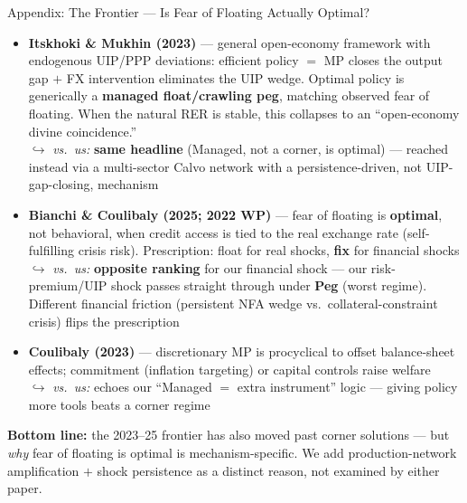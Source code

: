 \begin{frame}{Appendix: The Frontier --- Is Fear of Floating Actually Optimal?}

{\scriptsize
\begin{itemize}\setlength{\itemsep}{5pt}
\item \textbf{Itskhoki \& Mukhin (2023)} --- general open-economy framework with endogenous UIP/PPP deviations: efficient policy $=$ MP closes the output gap $+$ FX intervention eliminates the UIP wedge. Optimal policy is generically a \textbf{managed float/crawling peg}, matching observed fear of floating. When the natural RER is stable, this collapses to an ``open-economy divine coincidence.''
\\ \textcolor{customgreen!55!black}{$\hookrightarrow$ \emph{vs.\ us:}} \textbf{same headline} (Managed, not a corner, is optimal) --- reached instead via a multi-sector Calvo network with a persistence-driven, not UIP-gap-closing, mechanism

\item \textbf{Bianchi \& Coulibaly (2025; 2022 WP)} --- fear of floating is \textbf{optimal}, not behavioral, when credit access is tied to the real exchange rate (self-fulfilling crisis risk). Prescription: float for real shocks, \textbf{fix} for financial shocks
\\ \textcolor{customgreen!55!black}{$\hookrightarrow$ \emph{vs.\ us:}} \textbf{opposite ranking} for our financial shock --- our risk-premium/UIP shock passes straight through under \textbf{Peg} (worst regime). Different financial friction (persistent NFA wedge vs.\ collateral-constraint crisis) flips the prescription

\item \textbf{Coulibaly (2023)} --- discretionary MP is procyclical to offset balance-sheet effects; commitment (inflation targeting) or capital controls raise welfare
\\ \textcolor{customgreen!55!black}{$\hookrightarrow$ \emph{vs.\ us:}} echoes our ``Managed $=$ extra instrument'' logic --- giving policy more tools beats a corner regime
\end{itemize}}

\vspace{4pt}
{\scriptsize \textbf{Bottom line:} the 2023--25 frontier has also moved past corner solutions --- but \emph{why} fear of floating is optimal is mechanism-specific. We add production-network amplification $+$ shock persistence as a distinct reason, not examined by either paper.}

\end{frame}

